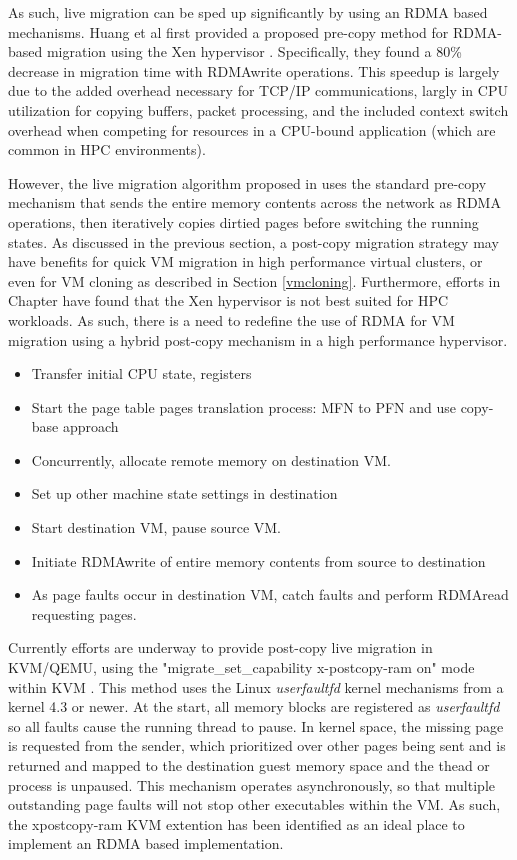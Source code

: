 As such, live migration can be sped up significantly by using an RDMA based mechanisms. Huang et al first provided a proposed pre-copy method for RDMA-based migration using the Xen hypervisor \cite{huang2007high}. Specifically, they found a 80\% decrease in migration time with RDMAwrite operations. This speedup is largely due to the added overhead necessary for TCP/IP communications, largly in CPU utilization for copying buffers, packet processing, and the included context switch overhead when competing for resources in a CPU-bound application (which are common in HPC environments). 

 However, the live migration algorithm proposed in \cite{huang2007high} uses the standard pre-copy mechanism that sends the entire memory contents across the network as RDMA operations, then iteratively copies dirtied pages before switching the running states.  As discussed in the previous section, a post-copy migration strategy may have benefits for quick VM migration in high performance virtual clusters, or even for VM cloning as described in Section \ref{vmcloning}. Furthermore, efforts in Chapter \cite{chap:cloud2011} have found that the Xen hypervisor is not best suited for HPC workloads.  As such, there is a need to redefine the use of RDMA for VM migration using a hybrid post-copy mechanism in a high performance hypervisor.   

\begin{itemize}
\item Transfer initial CPU state, registers
\item Start the page table pages translation process: MFN to PFN and use copy-base approach
\item Concurrently, allocate remote memory on destination VM.
\item Set up other machine state settings in destination
\item Start destination VM, pause source VM.
\item Initiate RDMAwrite of entire memory contents from source to destination
\item As page faults occur in destination VM, catch faults and perform RDMAread requesting pages. 
\end{itemize}

Currently efforts are underway to provide post-copy live migration in KVM/QEMU, using the "migrate\_set\_capability x-postcopy-ram on" mode within KVM \cite{www-kvm-postcopy}. This method uses the Linux \emph{userfaultfd} kernel mechanisms from a kernel 4.3 or newer. At the start, all memory blocks are registered as \emph{userfaultfd} so all faults cause the running thread to pause. In kernel space, the missing page is requested from the sender, which prioritized over other pages being sent and is returned and mapped to the destination guest memory space and the thead or process is unpaused. This mechanism operates asynchronously, so that multiple outstanding page faults will not stop other executables within the VM. As such, the xpostcopy-ram KVM extention has been identified as an ideal place to implement an RDMA based implementation. 


